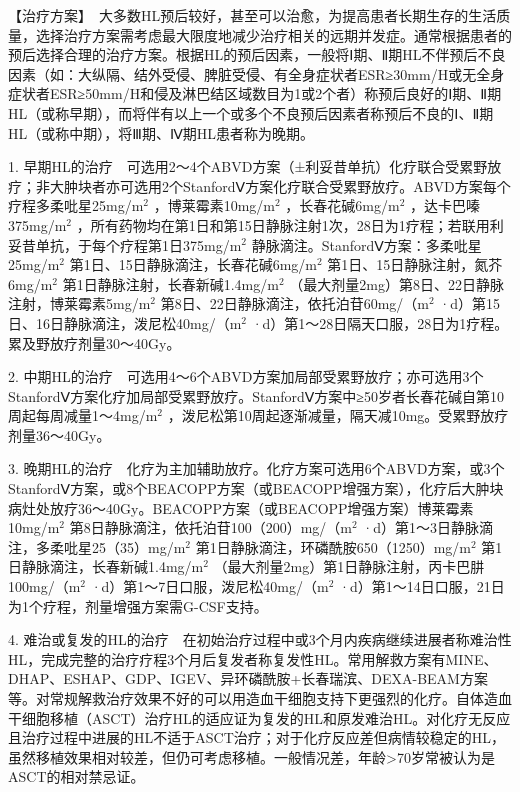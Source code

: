 【治疗方案】　大多数HL预后较好，甚至可以治愈，为提高患者长期生存的生活质量，选择治疗方案需考虑最大限度地减少治疗相关的远期并发症。通常根据患者的预后选择合理的治疗方案。根据HL的预后因素，一般将Ⅰ期、Ⅱ期HL不伴预后不良因素（如：大纵隔、结外受侵、脾脏受侵、有全身症状者ESR≥30mm/H或无全身症状者ESR≥50mm/H和侵及淋巴结区域数目为1或2个者）称预后良好的Ⅰ期、Ⅱ期HL（或称早期），而将伴有以上一个或多个不良预后因素者称预后不良的Ⅰ、Ⅱ期HL（或称中期），将Ⅲ期、Ⅳ期HL患者称为晚期。

1.
早期HL的治疗　可选用2～4个ABVD方案（±利妥昔单抗）化疗联合受累野放疗；非大肿块者亦可选用2个StanfordⅤ方案化疗联合受累野放疗。ABVD方案每个疗程多柔吡星25mg/m$^2$
，博莱霉素10mg/m$^2$ ，长春花碱6mg/m$^2$ ，达卡巴嗪375mg/m$^2$
，所有药物均在第1日和第15日静脉注射1次，28日为1疗程；若联用利妥昔单抗，于每个疗程第1日375mg/m$^2$
静脉滴注。StanfordⅤ方案：多柔吡星25mg/m$^2$
第1日、15日静脉滴注，长春花碱6mg/m$^2$ 第1日、15日静脉注射，氮芥6mg/m$^2$
第1日静脉注射，长春新碱1.4mg/m$^2$
（最大剂量2mg）第8日、22日静脉注射，博莱霉素5mg/m$^2$
第8日、22日静脉滴注，依托泊苷60mg/（m$^2$
·d）第15日、16日静脉滴注，泼尼松40mg/（m$^2$
·d）第1～28日隔天口服，28日为1疗程。累及野放疗剂量30～40Gy。

2.
中期HL的治疗　可选用4～6个ABVD方案加局部受累野放疗；亦可选用3个StanfordⅤ方案化疗加局部受累野放疗。StanfordⅤ方案中≥50岁者长春花碱自第10周起每周减量1～4mg/m$^2$
，泼尼松第10周起逐渐减量，隔天减10mg。受累野放疗剂量36～40Gy。

3.
晚期HL的治疗　化疗为主加辅助放疗。化疗方案可选用6个ABVD方案，或3个StanfordⅤ方案，或8个BEACOPP方案（或BEACOPP增强方案），化疗后大肿块病灶处放疗36～40Gy。BEACOPP方案（或BEACOPP增强方案）博莱霉素10mg/m$^2$
第8日静脉滴注，依托泊苷100（200）mg/（m$^2$
·d）第1～3日静脉滴注，多柔吡星25（35）mg/m$^2$
第1日静脉滴注，环磷酰胺650（1250）mg/m$^2$
第1日静脉滴注，长春新碱1.4mg/m$^2$
（最大剂量2mg）第1日静脉注射，丙卡巴肼100mg/（m$^2$
·d）第1～7日口服，泼尼松40mg/（m$^2$
·d）第1～14日口服，21日为1个疗程，剂量增强方案需G-CSF支持。

4.
难治或复发的HL的治疗　在初始治疗过程中或3个月内疾病继续进展者称难治性HL，完成完整的治疗疗程3个月后复发者称复发性HL。常用解救方案有MINE、DHAP、ESHAP、GDP、IGEV、异环磷酰胺+长春瑞滨、DEXA-BEAM方案等。对常规解救治疗效果不好的可以用造血干细胞支持下更强烈的化疗。自体造血干细胞移植（ASCT）治疗HL的适应证为复发的HL和原发难治HL。对化疗无反应且治疗过程中进展的HL不适于ASCT治疗；对于化疗反应差但病情较稳定的HL，虽然移植效果相对较差，但仍可考虑移植。一般情况差，年龄\textgreater{}70岁常被认为是ASCT的相对禁忌证。

